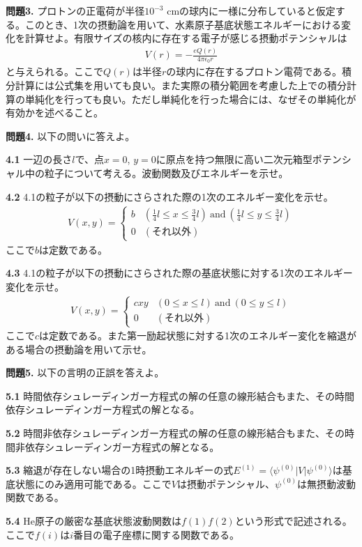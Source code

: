 \documentclass[11pt,pra,aps]{revtex4}
\begin{document}
\noindent
{\bf 問題3.} プロトンの正電荷が半径$10^{-3}$ cmの球内に一様に分布していると仮定する。このとき、1次の摂動論を用いて、水素原子基底状態エネルギーにおける変化を計算せよ。有限サイズの核内に存在する電子が感じる摂動ポテンシャルは
\begin{align}
  V(r) = -\frac{eQ(r)}{4\pi\epsilon_0 r}
\end{align}
と与えられる。ここで$Q(r)$は半径$r$の球内に存在するプロトン電荷である。積分計算には公式集を用いても良い。また実際の積分範囲を考慮した上での積分計算の単純化を行っても良い。ただし単純化を行った場合には、なぜその単純化が有効かを述べること。

\noindent
{\bf 問題4.} 以下の問いに答えよ。

\noindent
{\bf 4.1} 一辺の長さ$l$で、点$x=0$, $y=0$に原点を持つ無限に高い二次元箱型ポテンシャル中の粒子について考える。波動関数及びエネルギーを示せ。
    
\noindent
{\bf 4.2} 4.1の粒子が以下の摂動にさらされた際の1次のエネルギー変化を示せ。
\begin{align}
  V(x,y) = \left\{
  \begin{array}{ll}
    b & (\frac{1}{4}l\leq x\leq\frac{3}{4}l) \ \text{and}\ (\frac{1}{4}l\leq y\leq\frac{3}{4}l) \\
    0 & (\text{それ以外})
  \end{array}
  \right.
\end{align}
ここで$b$は定数である。

\noindent
{\bf 4.3} 4.1の粒子が以下の摂動にさらされた際の基底状態に対する1次のエネルギー変化を示せ。
\begin{align}
  V(x,y) = \left\{
  \begin{array}{ll}
    cxy & (0\leq x\leq l) \ \text{and}\ (0\leq y\leq l) \\
    0 & (\text{それ以外})
  \end{array}
  \right.
\end{align}
ここで$c$は定数である。また第一励起状態に対する1次のエネルギー変化を縮退がある場合の摂動論を用いて示せ。

\noindent
{\bf 問題5.} 以下の言明の正誤を答えよ。
    
\noindent
{\bf 5.1} 時間依存シュレーディンガー方程式の解の任意の線形結合もまた、その時間依存シュレーディンガー方程式の解となる。

\noindent
{\bf 5.2} 時間非依存シュレーディンガー方程式の解の任意の線形結合もまた、その時間非依存シュレーディンガー方程式の解となる。

\noindent
{\bf 5.3} 縮退が存在しない場合の1時摂動エネルギーの式$E^{(1)}=\langle\psi^{(0)}|V|\psi^{(0)}\rangle$は基底状態にのみ適用可能である。ここで$V$は摂動ポテンシャル、$\psi^{(0)}$は無摂動波動関数である。

\noindent
{\bf 5.4} He原子の厳密な基底状態波動関数は$f(1)f(2)$という形式で記述される。ここで$f(i)$は$i$番目の電子座標に関する関数である。
    
\end{document}
